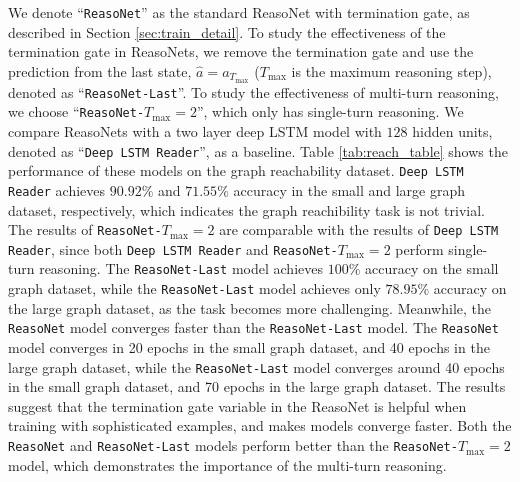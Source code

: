 \documentclass[sigconf]{acmart}
\begin{document}
We denote ``\texttt{ReasoNet}'' as the standard ReasoNet with termination gate, as described in Section \ref{sec:train_detail}. To study the effectiveness of the termination gate in ReasoNets, we remove the termination gate and use the prediction from the last state, $\hat{a} = a_{T_{\text{max}}}$ ($T_{\text{max}}$ is the maximum reasoning step), denoted as ``\texttt{ReasoNet-Last}''. To study the effectiveness of multi-turn reasoning, we choose ``\texttt{ReasoNet-$T_\text{max}=2$}'', which only has single-turn reasoning.
We compare ReasoNets with a two layer deep LSTM model \citep{HermannNIPS2015} with $128$ hidden units, denoted as ``\texttt{Deep LSTM Reader}'', as a baseline.
Table \ref{tab:reach_table} shows the performance of these models on the graph reachability dataset.
\texttt{Deep LSTM Reader} achieves $90.92\%$ and $71.55\%$ accuracy in the small and large graph dataset, respectively, which indicates the graph reachibility task is not trivial.
The results of \texttt{ReasoNet-$T_\text{max}=2$} are comparable with the results of \texttt{Deep LSTM Reader}, since both \texttt{Deep LSTM Reader} and \texttt{ReasoNet-$T_\text{max}=2$} perform single-turn reasoning.
The \texttt{ReasoNet-Last} model achieves $100\%$ accuracy on the small graph dataset, while the \texttt{ReasoNet-Last} model achieves only $78.95\%$ accuracy on the large graph dataset, as the task becomes more challenging.
Meanwhile, the \texttt{ReasoNet} model converges faster than the \texttt{ReasoNet-Last} model. The \texttt{ReasoNet} model converges in 20 epochs in the small graph dataset, and 40 epochs in the large graph dataset, while the \texttt{ReasoNet-Last} model converges around 40 epochs in the small graph dataset, and 70 epochs in the large graph dataset. The results suggest that the termination gate variable in the ReasoNet is helpful when training with sophisticated examples, and makes models converge faster. Both the \texttt{ReasoNet} and \texttt{ReasoNet-Last} models perform better than the \texttt{ReasoNet-$T_\text{max}=2$} model, which demonstrates the importance of the multi-turn reasoning. 
\end{document}
